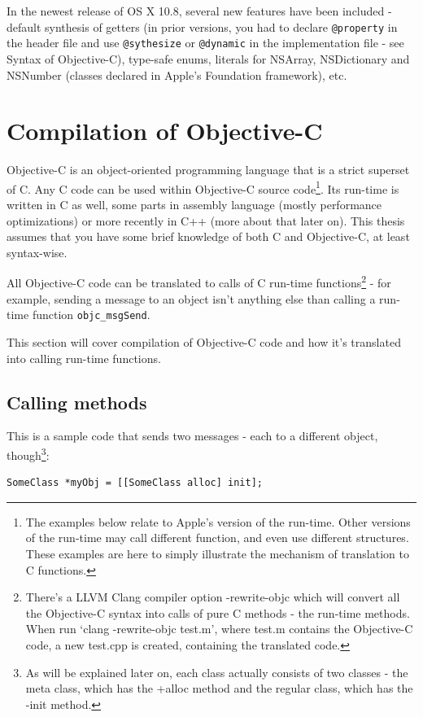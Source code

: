 \documentclass[a4paper, 11pt, fleqn]{book}
\begin{document}
In the newest release of OS X 10.8, several new features have been included - default synthesis of getters (in prior versions, you had to declare \verb=@property= in the header file and use \verb=@sythesize= or \verb=@dynamic= in the implementation file - see Syntax of Objective-C), type-safe enums, literals for NSArray, NSDictionary and NSNumber (classes declared in Apple's Foundation framework), etc.

\section{Compilation of Objective-C}

Objective-C is an object-oriented programming language that is a strict superset of C. Any C code can be used within Objective-C source code\footnote{The examples below relate to Apple's version of the run-time. Other versions of the run-time may call different function, and even use different structures. These examples are here to simply illustrate the mechanism of translation to C functions.}. Its run-time is written in C as well, some parts in assembly language (mostly performance optimizations) or more recently in C++ (more about that later on). This thesis assumes that you have some brief knowledge of both C and Objective-C, at least syntax-wise.

All Objective-C code can be translated to calls of C run-time functions\footnote{There's a LLVM Clang compiler option -rewrite-objc which will convert all the Objective-C syntax into calls of pure C methods - the run-time methods. When run `clang -rewrite-objc test.m', where test.m contains the Objective-C code, a new test.cpp is created, containing the translated code.} - for example, sending a message to an object isn't anything else than calling a run-time function \verb=objc_msgSend=.

This section will cover compilation of Objective-C code and how it's translated into calling run-time functions.

\subsection{Calling methods}

This is a sample code that sends two messages - each to a different object, though\footnote{As will be explained later on, each class actually consists of two classes - the meta class, which has the +alloc method and the regular class, which has the -init method.}:
\begin{verbatim}SomeClass *myObj = [[SomeClass alloc] init];\end{verbatim}
\end{document}
